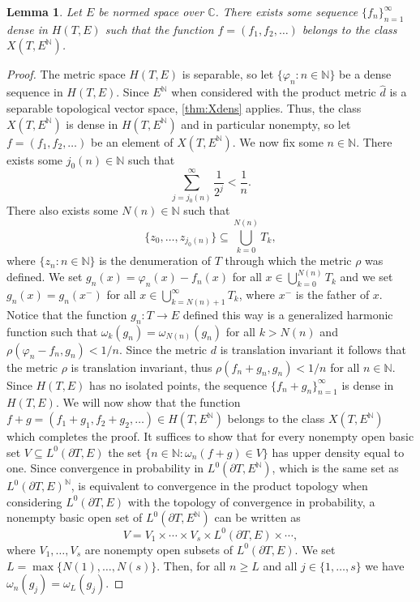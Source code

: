 \documentclass[twoside, 11pt]{article}
\renewcommand{\geq}{\geqslant}
\newcommand{\C}{\mathbb{C}}
\newcommand{\N}{\mathbb{N}}
\theoremstyle{plain}
\newtheorem{lemma}[theorem]{Lemma}
\theoremstyle{definition}
\begin{document}
\begin{lemma}
\label{lem:density}
Let $E$ be normed space over $\C$.
There exists some sequence $\{f_n\}_{n=1}^{\infty}$ dense in $H(T,E)$ such that the function $f = (f_1,f_2,\dots) $ belongs to the class $X(T,E^\N)$.
\end{lemma}
\begin{proof}
The metric space $H(T,E)$ is separable, so let $\{\varphi_n: n \in \N\}$ be a dense sequence in $H(T,E)$.
Since $E^\N$ when considered with the product metric $\hat{d}$ is a separable topological vector space, \cref{thm:Xdens} applies.
Thus, the class $X(T,E^\N)$ is dense in $H(T,E^\N)$ and in particular nonempty, so let $f = (f_1,f_2,\dots)$ be an element of $X(T,E^\N)$.
We now fix some $n \in \N$.
There exists some $j_0(n)\in \N$ such that
$$\sum_{j= j_0(n)}^{\infty}{\frac{1}{2^j}} < \frac{1}{n}.$$
There also exists some $N(n) \in \N$ such that
$$\{z_0,\dots,z_{j_0(n)} \} \subseteq \bigcup_{k=0}^{N(n)}{T_k},$$
where $\{z_n:n\in \N\}$ is the denumeration of $T$ through which the metric $\rho$ was defined.
We set $g_n(x) = \varphi_n(x)-f_n(x)$ for all $x \in \bigcup_{k=0}^{N(n)}{T_k}$ and we set $g_n(x) = g_n(x^-)$ for all $x \in \bigcup_{k=N(n)+1}^{\infty}{T_k}$, where $x^-$ is the father of $x$.
Notice that the function $g_n: T \to E$ defined this way is a generalized harmonic function such that $\omega_k(g_n) = \omega_{N(n)}(g_n)$ for all $k > N(n)$ and $\rho(\varphi_n - f_n,g_n) < 1/n$.
Since the metric $d$ is translation invariant it follows that the metric $\rho$ is translation invariant, thus $\rho(f_n + g_n, g_n) < 1/n$ for all $n \in \N$.
Since $H(T,E)$ has no isolated points, the sequence $\{f_n + g_n\}_{n=1}^{\infty}$ is dense in $H(T,E)$.
We will now show that the function $f+g = (f_1+g_1,f_2+g_2,\dots)\in H(T,E^\N)$ belongs to the class $X(T,E^\N)$ which completes the proof.
It suffices to show that for every nonempty open basic set $V \subseteq L^0(\partial T,E)$ the set $\{n \in \N: \omega_n(f+g) \in V\}$ has upper density equal to one.
Since convergence in probability in $L^0(\partial T,E^\N)$, which is the same set as $L^0(\partial T,E)^\N$, is equivalent to convergence in the product topology when considering $L^0(\partial T,E)$ with the topology of convergence in probability, a nonempty basic open set of $L^0(\partial T,E^\N)$ can be written as
$$V = V_1 \times \cdots \times V_s \times L^0(\partial T, E) \times \cdots,$$
where $V_1,\dots,V_s$ are nonempty open subsets of $L^0(\partial T, E)$.
We set $L = \max\{N(1),\dots,N(s)\}$.
Then, for all $n \geq L$ and all $j \in \{1,\dots,s\}$ we have $\omega_n(g_j) = \omega_L(g_j)$.

\end{proof}
\end{document}
